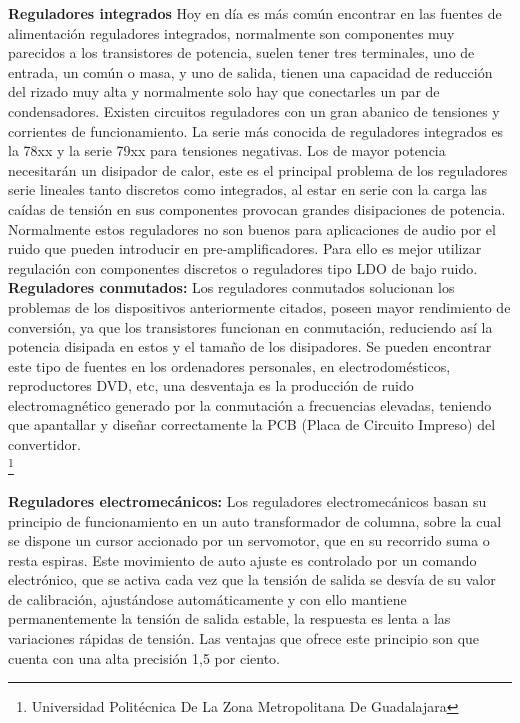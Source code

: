 \documentclass[10pt,a4paper]{article}
\begin{document}
\textbf{Reguladores integrados}
Hoy en día es más común encontrar en las fuentes de alimentación reguladores integrados, normalmente son componentes muy parecidos a los transistores de potencia, suelen tener tres terminales, uno de entrada, un común o masa, y uno de salida, tienen una capacidad de reducción del rizado muy alta y normalmente solo hay que conectarles un par de condensadores. Existen circuitos reguladores con un gran abanico de tensiones y corrientes de funcionamiento. La serie más conocida de reguladores integrados es la 78xx y la serie 79xx para tensiones negativas. Los de mayor potencia necesitarán un disipador de calor, este es el principal problema de los reguladores serie lineales tanto discretos como integrados, al estar en serie con la carga las caídas de tensión en sus componentes provocan grandes disipaciones de potencia. Normalmente estos reguladores no son buenos para aplicaciones de audio por el ruido que pueden introducir en pre-amplificadores. Para ello es mejor utilizar regulación con componentes discretos o reguladores tipo LDO de bajo ruido. \\

\textbf{Reguladores conmutados:}
Los reguladores conmutados solucionan los problemas de los dispositivos anteriormente citados, poseen mayor rendimiento de conversión, ya que los transistores funcionan en conmutación, reduciendo así la potencia disipada en estos y el tamaño de los disipadores. Se pueden encontrar este tipo de fuentes en los ordenadores personales, en electrodomésticos, reproductores DVD, etc, una desventaja es la producción de ruido electromagnético generado por la conmutación a frecuencias elevadas, teniendo que apantallar y diseñar correctamente la PCB (Placa de Circuito Impreso) del convertidor.\\

\footnote{Universidad Politécnica De La Zona Metropolitana De Guadalajara}
\newpage

\textbf{Reguladores electromecánicos:}
Los reguladores electromecánicos basan su principio de funcionamiento en un auto transformador de columna, sobre la cual se dispone un cursor accionado por un servomotor, que en su recorrido suma o resta espiras. Este movimiento de auto ajuste es controlado por un comando electrónico, que se activa cada vez que la tensión de salida se desvía de su valor de calibración, ajustándose automáticamente y con ello mantiene permanentemente la tensión de salida estable, la respuesta es lenta a las variaciones rápidas de tensión. Las ventajas que ofrece este principio son que cuenta con una alta precisión 1,5 por ciento.
\end{document}
